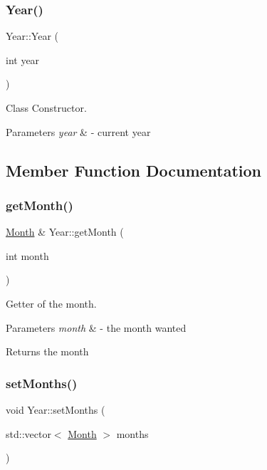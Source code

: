 \subsubsection{\texorpdfstring{Year()}{Year()}}
{\footnotesize\ttfamily Year\+::\+Year (\begin{DoxyParamCaption}\item[{int}]{year }\end{DoxyParamCaption})}



Class Constructor. 


\begin{DoxyParams}{Parameters}
{\em year} & -\/ current year \\
\hline
\end{DoxyParams}


\subsection{Member Function Documentation}
\mbox{\label{class_year_a64bc478fe629fc966b7bfadb1d939a88}} 
\subsubsection{\texorpdfstring{get\+Month()}{getMonth()}}
{\footnotesize\ttfamily \mbox{\hyperlink{class_month}{Month}} \& Year\+::get\+Month (\begin{DoxyParamCaption}\item[{int}]{month }\end{DoxyParamCaption})}



Getter of the month. 


\begin{DoxyParams}{Parameters}
{\em month} & -\/ the month wanted \\
\hline
\end{DoxyParams}
\begin{DoxyReturn}{Returns}
the month 
\end{DoxyReturn}
\mbox{\label{class_year_a1478407d9100f722e54daaf1ce2a413c}} 
\subsubsection{\texorpdfstring{set\+Months()}{setMonths()}}
{\footnotesize\ttfamily void Year\+::set\+Months (\begin{DoxyParamCaption}\item[{std\+::vector$<$ \mbox{\hyperlink{class_month}{Month}} $>$}]{months }\end{DoxyParamCaption})}



